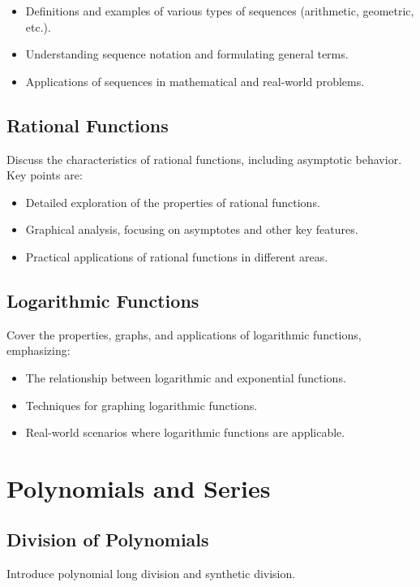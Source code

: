 \documentclass[a4paper,12pt]{book}
\newcounter{problem}
\newcounter{example}
\begin{document}
\begin{itemize}
    \item Definitions and examples of various types of sequences (arithmetic, geometric, etc.).
    \item Understanding sequence notation and formulating general terms.
    \item Applications of sequences in mathematical and real-world problems.
\end{itemize}


\subsection{Rational Functions}
\label{subsec:rational_functions_chapter}
Discuss the characteristics of rational functions, including asymptotic behavior. Key points are:


\begin{itemize}
    \item Detailed exploration of the properties of rational functions.
    \item Graphical analysis, focusing on asymptotes and other key features.
    \item Practical applications of rational functions in different areas.
\end{itemize}


\subsection{Logarithmic Functions}
\label{subsec:logarithmic_functions}
Cover the properties, graphs, and applications of logarithmic functions, emphasizing:


\begin{itemize}
    \item The relationship between logarithmic and exponential functions.
    \item Techniques for graphing logarithmic functions.
    \item Real-world scenarios where logarithmic functions are applicable.
\end{itemize}


\section{Polynomials and Series}
\label{sec:polynomials_and_series}


\subsection{Division of Polynomials}
\label{subsec:division_of_polynomials}
Introduce polynomial long division and synthetic division.
\end{document}
